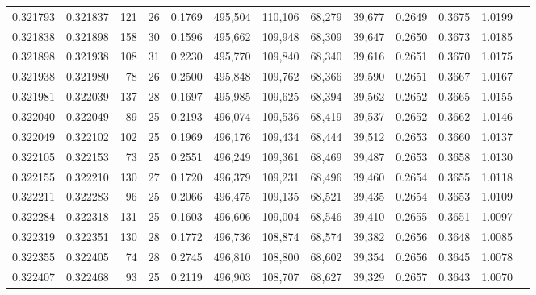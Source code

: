 \begin{tabular}{rrrrrrrrrrrrr}
0.321793 & 0.321837 &   121 &  26 &                                     0.1769 & 495,504 & 110,106 &  68,279 &  39,677 & 0.2649 & 0.3675 & 1.0199 \\
0.321838 & 0.321898 &   158 &  30 &                                     0.1596 & 495,662 & 109,948 &  68,309 &  39,647 & 0.2650 & 0.3673 & 1.0185 \\
0.321898 & 0.321938 &   108 &  31 &                                     0.2230 & 495,770 & 109,840 &  68,340 &  39,616 & 0.2651 & 0.3670 & 1.0175 \\
0.321938 & 0.321980 &    78 &  26 &                                     0.2500 & 495,848 & 109,762 &  68,366 &  39,590 & 0.2651 & 0.3667 & 1.0167 \\
0.321981 & 0.322039 &   137 &  28 &                                     0.1697 & 495,985 & 109,625 &  68,394 &  39,562 & 0.2652 & 0.3665 & 1.0155 \\
0.322040 & 0.322049 &    89 &  25 &                                     0.2193 & 496,074 & 109,536 &  68,419 &  39,537 & 0.2652 & 0.3662 & 1.0146 \\
0.322049 & 0.322102 &   102 &  25 &                                     0.1969 & 496,176 & 109,434 &  68,444 &  39,512 & 0.2653 & 0.3660 & 1.0137 \\
0.322105 & 0.322153 &    73 &  25 &                                     0.2551 & 496,249 & 109,361 &  68,469 &  39,487 & 0.2653 & 0.3658 & 1.0130 \\
0.322155 & 0.322210 &   130 &  27 &                                     0.1720 & 496,379 & 109,231 &  68,496 &  39,460 & 0.2654 & 0.3655 & 1.0118 \\
0.322211 & 0.322283 &    96 &  25 &                                     0.2066 & 496,475 & 109,135 &  68,521 &  39,435 & 0.2654 & 0.3653 & 1.0109 \\
0.322284 & 0.322318 &   131 &  25 &                                     0.1603 & 496,606 & 109,004 &  68,546 &  39,410 & 0.2655 & 0.3651 & 1.0097 \\
0.322319 & 0.322351 &   130 &  28 &                                     0.1772 & 496,736 & 108,874 &  68,574 &  39,382 & 0.2656 & 0.3648 & 1.0085 \\
0.322355 & 0.322405 &    74 &  28 &                                     0.2745 & 496,810 & 108,800 &  68,602 &  39,354 & 0.2656 & 0.3645 & 1.0078 \\
0.322407 & 0.322468 &    93 &  25 &                                     0.2119 & 496,903 & 108,707 &  68,627 &  39,329 & 0.2657 & 0.3643 & 1.0070 \\

\end{tabular}
